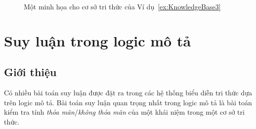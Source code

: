 \begin{figure}[h!]
	\caption{Một minh họa cho cơ sở tri thức của Ví dụ~\ref{ex:KnowledgeBase3}\label{fig:KnowledgeBase3}}
\end{figure}

\section{Suy luận trong logic mô tả}
\label{sec:Chap1.Reasoning}
\subsection{Giới thiệu}
\label{sec:Chap1.ReasoningIntroduction}
Có nhiều bài toán suy luận được đặt ra trong các hệ thống biểu diễn tri thức dựa trên logic mô tả. Bài toán suy luận quan trọng nhất trong logic mô tả là bài toán kiểm tra tính {\em thỏa mãn}/{\em không thỏa mãn} của một khái niệm trong một cơ sở tri thức.

